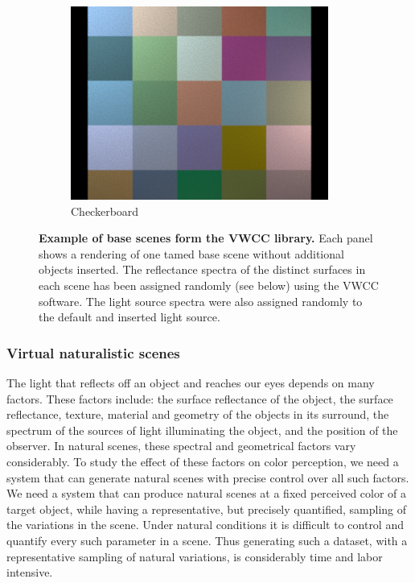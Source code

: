 \documentclass{jov}
\begin{document}
\begin{figure}[t]
\begin{subfigure}[b]{0.22 \textwidth}
        \includegraphics[width=\textwidth]{../Figures/Figure3/Figure3_f.png}
        \caption{Checkerboard}
        \label{fig:baseSceneCheckerBoard}
    \end{subfigure}
    \caption{{\bf Example of base scenes form the VWCC library.} Each panel shows a rendering of one tamed base scene without additional objects inserted.  The reflectance spectra of the distinct surfaces in each scene has been assigned randomly (see below) using the VWCC software.  The light source spectra were also assigned randomly to the default and inserted light source.}\label{fig:baseScenes}
\end{figure}

\subsubsection{Virtual naturalistic scenes}
The light that reflects off an object and reaches our eyes depends on many factors. These factors include: the surface reflectance of the object, the surface reflectance, texture, material and geometry of the objects in its surround, the spectrum of the sources of light illuminating the object, and the position of the observer. In natural scenes, these spectral and geometrical factors vary considerably. To study the effect of these factors on color perception, we need a system that can generate natural scenes with precise control over all such factors. We need a system that can produce natural scenes at a fixed perceived color of a target object, while having a representative, but precisely quantified, sampling of the variations in the scene. Under natural conditions it is difficult to control and quantify every such parameter in a scene. Thus generating such a dataset, with a representative sampling of natural variations, is considerably time and labor intensive.
\end{document}
